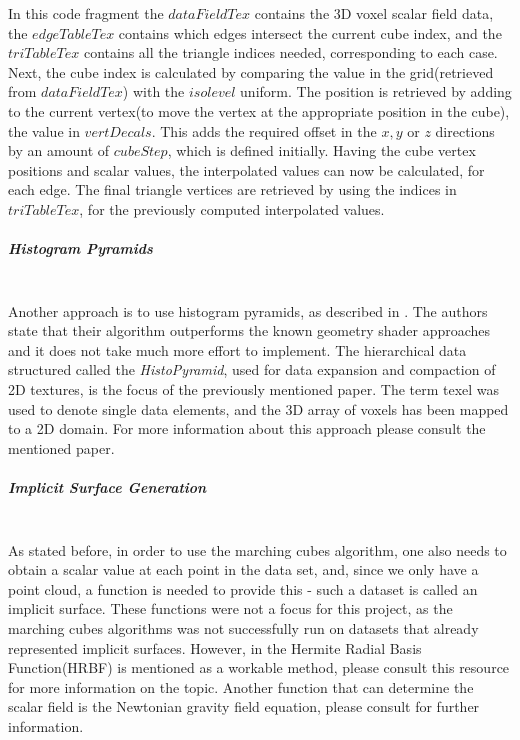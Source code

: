 \documentclass[]{article}
\begin{document}
\begin{appendices}
In this code fragment  the $dataFieldTex$ contains the 3D voxel scalar field data, the $edgeTableTex$ contains which edges intersect the current cube index, and the $triTableTex$ contains all the triangle indices needed, corresponding to each case. Next, the cube index is calculated by comparing the value in the grid(retrieved from $dataFieldTex$) with the $isolevel$ uniform. The position is retrieved by adding to the current vertex(to move the vertex at the appropriate position in the cube), the value in $vertDecals$. This adds the required offset in the $x,y$ or $z$ directions by an amount of $cubeStep$, which is defined initially. Having the cube vertex positions and scalar values, the interpolated values can now be calculated, for each edge. The final triangle vertices are retrieved by using the indices in $triTableTex$, for the previously computed interpolated values.

\subparagraph{Histogram Pyramids}\mbox{}\\

Another approach is to use histogram pyramids, as described in \cite{dyken2007}. The authors state that their algorithm outperforms the known geometry shader approaches and it does not take much more effort to implement. The hierarchical data structured called the \textit{HistoPyramid}, used for data expansion and compaction of 2D textures, is the focus of the previously mentioned paper. The term texel was used to denote single data elements, and the 3D array of voxels has been mapped to a 2D domain. For more information about this approach please consult the mentioned paper.


\subparagraph{Implicit Surface Generation}\mbox{}\\

As stated before, in order to use the marching cubes algorithm, one also needs to obtain a scalar value at each point in the data set, and, since we only have a point cloud, a function is needed to provide this - such a dataset is called an implicit surface. These functions were not a focus for this project, as the marching cubes algorithms was not successfully run on datasets that already represented implicit surfaces. However, in \cite{navpreet2013} the Hermite Radial Basis Function(HRBF) is mentioned as a workable method, please consult this resource for more information on the topic. Another function that can determine the scalar field is the Newtonian gravity field equation, please consult \cite{max2013} for further information.

\end{appendices}
\end{document}
